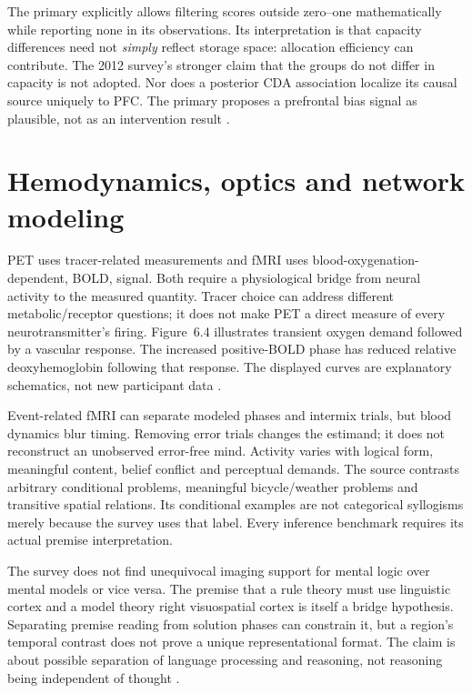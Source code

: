The primary explicitly allows filtering scores outside zero--one
mathematically while reporting none in its observations. Its
interpretation is that capacity differences need not \emph{simply}
reflect storage space: allocation efficiency can contribute.
The 2012 survey's stronger claim that the groups do not differ
in capacity is not adopted. Nor does a posterior CDA association
localize its causal source uniquely to PFC. The primary proposes
a prefrontal bias signal as plausible, not as an intervention result
\cite[p.~502]{VogelEtAl2005Selection}.

\section{Hemodynamics, optics and network modeling}
\label{sec:p19-ncm-hemodynamics}

PET uses tracer-related measurements and fMRI uses blood-oxygenation-
dependent, BOLD, signal. Both require a physiological bridge from
neural activity to the measured quantity. Tracer choice can address
different metabolic/receptor questions; it does not make PET a
direct measure of every neurotransmitter's firing. Figure~6.4
illustrates transient oxygen demand followed by a vascular response.
The increased positive-BOLD phase has reduced relative
deoxyhemoglobin following that response. The displayed curves
are explanatory schematics, not
new participant data \cite[pp.~77--78]{MorrisonKnowlton2012Methods}.

Event-related fMRI can separate modeled phases and intermix trials,
but blood dynamics blur timing. Removing error trials changes
the estimand; it does not reconstruct an unobserved error-free
mind. Activity varies with logical form, meaningful content, belief
conflict and perceptual demands. The source contrasts arbitrary
conditional problems, meaningful bicycle/weather problems and
transitive spatial relations. Its conditional examples are not
categorical syllogisms merely because the survey uses that label.
Every inference benchmark requires its actual premise interpretation.

The survey does not find unequivocal imaging support for mental
logic over mental models or vice versa. The premise that a
rule theory must use linguistic cortex and a model theory right
visuospatial cortex is itself a bridge hypothesis. Separating
premise reading from solution phases can constrain it, but a
region's temporal contrast does not prove a unique representational
format. The claim is about possible separation of language
processing and reasoning, not reasoning being independent of thought
\cite[pp.~78--79]{MorrisonKnowlton2012Methods}.

